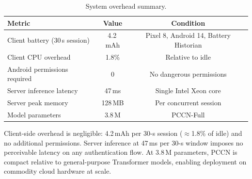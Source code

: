 \begin{table}[t]
\centering
\caption{System overhead summary.}
\label{tab:overhead}
\begin{tabular}{lcc}
\toprule
Metric & Value & Condition \\
\midrule
Client battery (30\,s session) & 4.2\,mAh & Pixel 8, Android 14, Battery Historian \\
Client CPU overhead             & 1.8\%    & Relative to idle \\
Android permissions required    & 0        & No dangerous permissions \\
Server inference latency        & 47\,ms   & Single Intel Xeon core \\
Server peak memory              & 128\,MB  & Per concurrent session \\
Model parameters                & 3.8\,M   & PCCN-Full \\
\bottomrule
\end{tabular}
\end{table}

Client-side overhead is negligible: 4.2\,mAh per 30-s session ($\approx$1.8\% of idle)
and no additional permissions.%
Server inference at 47\,ms per 30-s window imposes no perceivable latency on any
authentication flow.%
At 3.8\,M parameters, PCCN is compact relative to general-purpose Transformer models,
enabling deployment on commodity cloud hardware at scale.%
